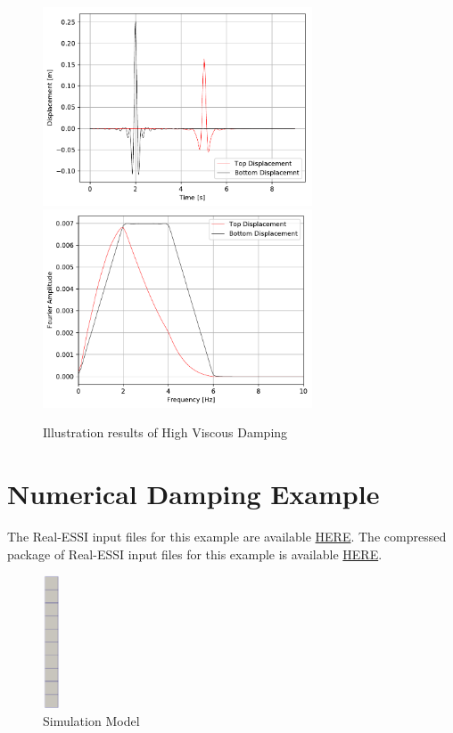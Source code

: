 \begin{figure}[H]
  \centering
  \includegraphics[width = 8cm]{./Figure-files/Day3/Viscous_nonlinear_behavior/Rayleigh002Displacement.pdf}
  \includegraphics[width = 8cm]{./Figure-files/Day3/Viscous_nonlinear_behavior/Rayleigh002Displacement_Spectrum.pdf}
  \caption{Illustration results of High Viscous Damping}
  \label{fig_day3_viscous_damping_high}
\end{figure}




\clearpage
\newpage
\section{ Numerical Damping Example }
\label{Numerical_Damping_Example}

The Real-ESSI input files for this example are available 
\href{http://cml01.engr.ucdavis.edu/shortCourse/Day3/Numerical_Damping_Example/newmark}{HERE}. 
The compressed package of Real-ESSI input files for this example is available 
\href{http://cml01.engr.ucdavis.edu/shortCourse/Day3/Numerical_Damping_Example/newmark/newmark.tgz}{HERE}. 


\begin{figure}[H]
  \centering
  \includegraphics[width = 0.5cm]{./Figure-files/Day3/Numerical_Damping_Example/overview.png}
  \caption{Simulation Model}
  \label{fig_contact_examples2}
\end{figure}


